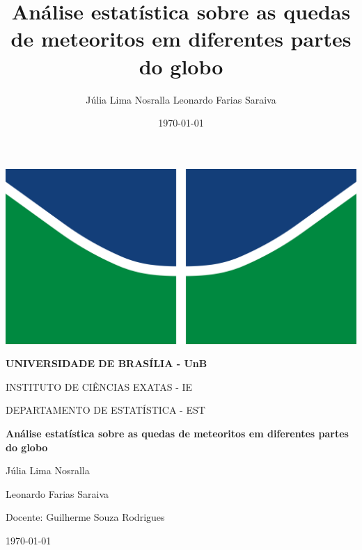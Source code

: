 \documentclass{article}
\title{Análise estatística sobre as quedas de meteoritos em diferentes partes do globo}
\author{
    Júlia Lima Nosralla
    Leonardo Farias Saraiva
}
\date{\today}
\begin{document}
\begin{titlepage}
    \centering

    \includegraphics[scale=0.02]{logo-unb.png} %
    
    \vspace*{0.5cm}
    {\large \textbf{UNIVERSIDADE DE BRASÍLIA - UnB} \par}
    {\large INSTITUTO DE CIÊNCIAS EXATAS - IE \par}
    {\large DEPARTAMENTO DE ESTATÍSTICA - EST \par}

    \vfill

    {\LARGE \textbf{Análise estatística sobre as quedas de meteoritos em diferentes partes do globo} \par}
    \vspace{1.5cm}
        
    \vfill
    
    {\large Júlia Lima Nosralla \par}    
    \vspace{0.2cm}
    {\large Leonardo Farias Saraiva \par}
    
    \vfill

    {\large Docente: Guilherme Souza Rodrigues}

    \vfill

    {\large \today \par}
\end{titlepage}
\end{document}
